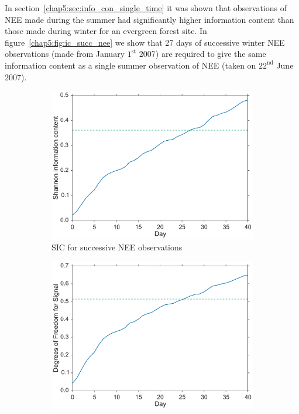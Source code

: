 In section~\ref{chap5:sec:info_con_single_time} it was shown that observations of NEE made during the summer had significantly higher information content than those made during winter for an evergreen forest site. In figure~\ref{chap5:fig:ic_succ_nee} we show that 27 days of successive winter NEE observations (made from January \(1^{\text{st}}\) 2007) are required to give the same information content as a single summer observation of NEE (taken on \( 22^{\text{nd}} \) June 2007).

\begin{figure}[ht]
    \centering
    \begin{subfigure}[b]{0.45\textwidth}
        \includegraphics[width=\textwidth]{chapter/chapter5/sic_succ_nee.pdf}
        \caption{SIC for successive NEE observations}
        \label{chap5:fig:sic_succ_nee}
    \end{subfigure} \hspace{5mm}
    \begin{subfigure}[b]{0.45\textwidth}
        \includegraphics[width=\textwidth]{chapter/chapter5/dfs_succ_nee.pdf}

\end{subfigure}
\end{figure}
